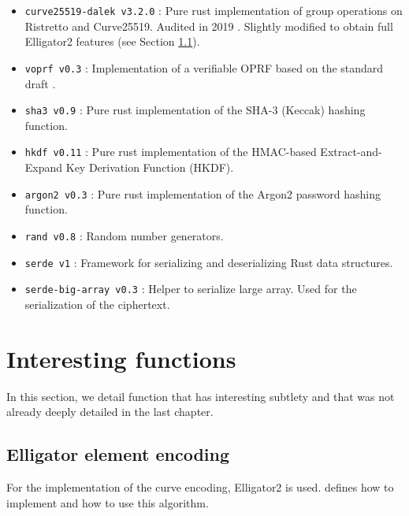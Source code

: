 ﻿\documentclass[../report.tex]{subfiles}
\begin{document}
\begin{itemize}
 \item \verb|curve25519-dalek v3.2.0| : Pure rust implementation of group operations on Ristretto and Curve25519. Audited in 2019 \cite{Curve25519_Dalek_Audit}. Slightly modified to obtain full Elligator2 features (see Section \ref{sec:elligator2_implementation_function}).
 \item \verb|voprf v0.3| : Implementation of a verifiable OPRF based on the standard draft \cite{VOPRF_Standard_Draft}.
 \item \verb|sha3 v0.9| : Pure rust implementation of the SHA-3 (Keccak) hashing function.
 \item \verb|hkdf v0.11| : Pure rust implementation of the HMAC-based Extract-and-Expand Key Derivation Function (HKDF).
 \item \verb|argon2 v0.3| : Pure rust implementation of the Argon2 password hashing function.
\item \verb|rand v0.8| : Random number generators.
 \item \verb|serde v1| : Framework for serializing and deserializing Rust data structures.
 \item \verb|serde-big-array v0.3| : Helper to serialize large array. Used for the serialization of the ciphertext.
\end{itemize}


\section{Interesting functions}
In this section, we detail function that has interesting subtlety and that was not already deeply detailed in the last chapter.


\subsection{Elligator element encoding} \label{sec:elligator2_implementation_function}
For the implementation of the curve encoding, Elligator2 is used.
\cite{Elligator2_Paper} defines how to implement and how to use this algorithm.
\end{document}
